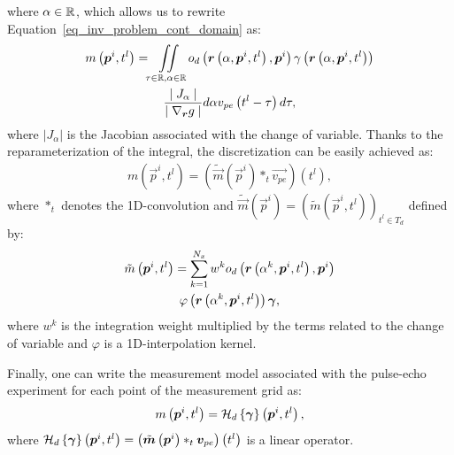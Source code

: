 \documentclass[conference]{IEEEtran}
\begin{document}
where $\alpha \in \mathbb{R}$, which allows us to rewrite Equation~\eqref{eq_inv_problem_cont_domain} as:
\begin{multline}
\label{eq_inv_problem_cont_domain_parameterized}
m\left(\bm{p}^i, t^l\right) = \iint \limits_{\tau \in \mathbb{R}, \alpha \in \mathbb{R}} o_d\left(\bm{r}\left(\alpha, \bm{p}^i, t^l\right), \bm{p}^i\right)\gamma \left(\bm{r}\left(\alpha, \bm{p}^i, t^l\right)\right) \\ \frac{\mid J_\alpha \mid}{\mid \nabla_{\bm{r}} g \mid} d\alpha v_{pe} \left(t^l - \tau\right) d \tau, 
\end{multline}
where $|J_\alpha|$ is the Jacobian associated with the change of variable. Thanks to the reparameterization of the integral, the discretization can be easily achieved as:
\begin{align}
\label{eq_inv_problem_dist_domain_parameterized}
m\left(\vec{p}^i, t^l\right) = \left(\tilde{\vec{m}}\left(\vec{p}^i\right) \ast_t \vec{v_{pe}}\right) \left(t^l\right), 
\end{align}
where $\ast_t$ denotes the \num{1}D-convolution and $\tilde{\vec{m}}\left(\vec{p}^i\right) = \left(\tilde{m}\left(\vec{p}^i, t^l\right)\right)_{t^l \in T_d}$ defined by:
\begin{multline}
\label{eq_m_tilde}
\tilde{m}\left(\bm{p}^i, t^l\right) = \sum \limits_{k = 1}^{N_x} w^k o_d\left(\bm{r}\left(\alpha^k, \bm{p}^i, t^l\right), \bm{p}^i\right) \\ \varphi \left(\bm{r}\left(\alpha^k, \bm{p}^i, t^l\right)\right) \bm{\gamma}, 
\end{multline}
where $w^k$ is the integration weight multiplied by the terms related to the change of variable and $\varphi$ is a \num{1}D-interpolation kernel. 

Finally, one can write the measurement model associated with the pulse-echo experiment for each point of the measurement grid as: 
\begin{equation}
	\label{eq_meas_mode_operator}
	m\left(\bm{p}^i, t^l\right) = \mathcal{H}_d\left\lbrace \bm{\gamma} \right\rbrace \left(\bm{p}^i, t^l\right),
\end{equation}
where $\mathcal{H}_d \left\lbrace \bm{\gamma} \right\rbrace \left(\bm{p}^i, t^l\right) = \left(\tilde{\bm{m}}\left(\bm{p}^i\right) \ast_t \bm{v}_{pe}\right) \left(t^l\right)$ is a linear operator.
\end{document}
